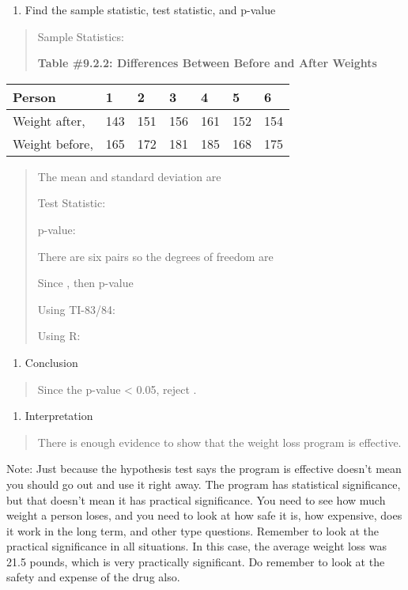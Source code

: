 \documentclass[]{book}
\providecommand{\tightlist}{%
  \setlength{\itemsep}{0pt}\setlength{\parskip}{0pt}}
\begin{document}
\begin{enumerate}
\def\labelenumi{\arabic{enumi}.}
\setcounter{enumi}{3}
\tightlist
\item
  Find the sample statistic, test statistic, and p-value
\end{enumerate}

\begin{quote}
Sample Statistics:

\textbf{Table \#9.2.2: Differences Between Before and After Weights}
\end{quote}

\begin{longtable}[]{@{}lllllll@{}}
\toprule
Person & 1 & 2 & 3 & 4 & 5 & 6\tabularnewline
\midrule
\endhead
Weight after, & 143 & 151 & 156 & 161 & 152 & 154\tabularnewline
Weight before, & 165 & 172 & 181 & 185 & 168 & 175\tabularnewline
\bottomrule
\end{longtable}

\begin{quote}
The mean and standard deviation are

Test Statistic:

p-value:

There are six pairs so the degrees of freedom are

Since , then p-value

Using TI-83/84:

Using R:
\end{quote}

\begin{enumerate}
\def\labelenumi{\arabic{enumi}.}
\setcounter{enumi}{4}
\tightlist
\item
  Conclusion
\end{enumerate}

\begin{quote}
Since the p-value \textless{} 0.05, reject .
\end{quote}

\begin{enumerate}
\def\labelenumi{\arabic{enumi}.}
\setcounter{enumi}{5}
\tightlist
\item
  Interpretation
\end{enumerate}

\begin{quote}
There is enough evidence to show that the weight loss program is effective.
\end{quote}

Note: Just because the hypothesis test says the program is effective doesn't mean you should go out and use it right away. The program has statistical significance, but that doesn't mean it has practical significance. You need to see how much weight a person loses, and you need to look at how safe it is, how expensive, does it work in the long term, and other type questions. Remember to look at the practical significance in all situations. In this case, the average weight loss was 21.5 pounds, which is very practically significant. Do remember to look at the safety and expense of the drug also.
\end{document}
